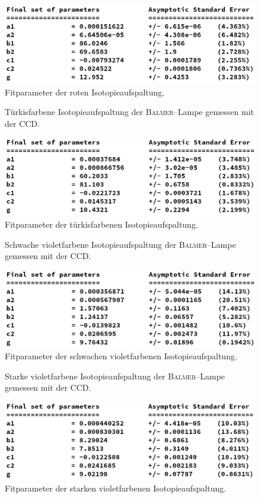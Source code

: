 \documentclass[sn-mathphys-num,iicol]{sn-jnl}
\theoremstyle{thmstyleone}
\theoremstyle{thmstyletwo}
\theoremstyle{thmstylethree}
\begin{document}
\begin{figure}[h]
        \centering
        \includegraphics[width=.5\textwidth]{ccdrot_params.png}
        \caption{Fitparameter der roten Isotopieaufspaltung.}
\end{figure}
\begin{figure}[h]
        \centering
        \resizebox{.5\textwidth}{!}{}
        \caption{Türkisfarbene Isotopieaufspaltung der \textsc{Balmer}--Lampe gemessen mit der CCD.} \label{fig:ccdtürkis}
\end{figure}
\begin{figure}[h]
        \centering
        \includegraphics[width=.5\textwidth]{ccdtuerkis_params.png}
        \caption{Fitparameter der türkisfarbenen Isotopieaufspaltung.}
\end{figure}
\begin{figure}[h]
        \centering
        \resizebox{.5\textwidth}{!}{}
        \caption{Schwache violetfarbene Isotopieaufspaltung der \textsc{Balmer}--Lampe gemessen mit der CCD.} \label{fig:ccdvioletschwach}
\end{figure}
\begin{figure}[h]
        \centering
        \includegraphics[width=.5\textwidth]{ccdvioletschwach_params.png}
        \caption{Fitparameter der schwachen violetfarbenen Isotopieaufspaltung.}
\end{figure}
\begin{figure}[h]
        \centering
        \resizebox{.5\textwidth}{!}{}
        \caption{Starke violetfarbene Isotopieaufspaltung der \textsc{Balmer}--Lampe gemessen mit der CCD.} \label{fig:ccdvioletstark}
\end{figure}
\begin{figure}[h]
        \centering
        \includegraphics[width=.5\textwidth]{ccdvioletstark_params.png}
        \caption{Fitparameter der starken violetfarbenen Isotopieaufspaltung.}
\end{figure}

\clearpage

\end{document}
